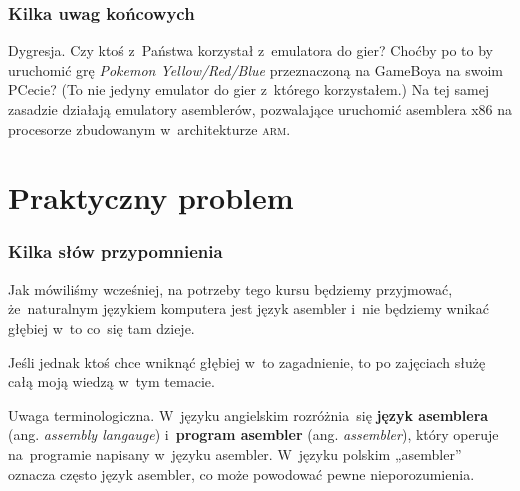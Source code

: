 \documentclass[10pt,t]{beamer}
\begin{document}





\begin{frame}
  \frametitle{Kilka uwag końcowych}


  \alert{Dygresja.} Czy ktoś z~Państwa korzystał z~emulatora do gier?
  Choćby po to by uruchomić grę \textit{Pokemon Yellow/Red/Blue}
  przeznaczoną na GameBoya na swoim PCecie? (To nie jedyny emulator do gier
  z~którego korzystałem.) Na tej samej zasadzie działają emulatory
  asemblerów, pozwalające uruchomić asemblera x86 na procesorze
  zbudowanym w~architekturze \textsc{arm}.



\end{frame}

























\section{Praktyczny problem}



\begin{frame}
  \frametitle{Kilka słów przypomnienia}


  Jak mówiliśmy wcześniej, na potrzeby tego kursu będziemy przyjmować,
  że~naturalnym językiem komputera jest język asembler i~nie będziemy
  wnikać głębiej w~to co~się tam dzieje.

  Jeśli jednak ktoś chce wniknąć głębiej w~to zagadnienie, to po zajęciach
  służę całą moją wiedzą w~tym temacie.

  \alert{Uwaga terminologiczna.} W~języku angielskim rozróżnia~się
  \textbf{język asemblera} (ang. \textit{assembly langauge})
  i~\textbf{program asembler} (ang. \textit{assembler}), który operuje
  na~programie napisany w~języku asembler. W~języku polskim „asembler”
  oznacza często język asembler, co może powodować pewne nieporozumienia.

\end{frame}
\end{document}
